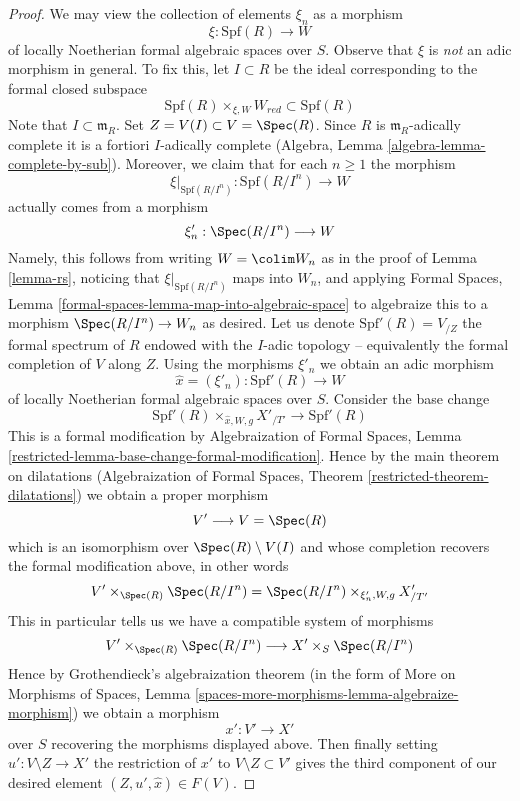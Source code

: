 \begin{proof}
\medskip\noindent
We may view the collection of elements $\xi_n$ as a morphism
$$
\xi : \text{Spf}(R) \longrightarrow W
$$
of locally Noetherian formal algebraic spaces over $S$. Observe that $\xi$
is {\it not} an adic morphism in general. To fix this, let $I \subset R$
be the ideal corresponding to the formal closed subspace
$$
\text{Spf}(R) \times_{\xi, W} W_{red} \subset \text{Spf}(R)
$$
Note that $I \subset \mathfrak m_R$. Set $Z = V(I) \subset V = \Spec(R)$.
Since $R$ is $\mathfrak m_R$-adically complete it is a fortiori
$I$-adically complete (Algebra, Lemma \ref{algebra-lemma-complete-by-sub}).
Moreover, we claim that for each $n \geq 1$ the morphism
$$
\xi|_{\text{Spf}(R/I^n)} :
\text{Spf}(R/I^n)
\longrightarrow
W
$$
actually comes from a morphism
$$
\xi'_n :  \Spec(R/I^n) \longrightarrow W
$$
Namely, this follows from writing $W = \colim W_n$ as in the
proof of Lemma \ref{lemma-rs}, noticing that $\xi|_{\text{Spf}(R/I^n)}$
maps into $W_n$, and applying Formal Spaces, Lemma
\ref{formal-spaces-lemma-map-into-algebraic-space}
to algebraize this to a morphism $\Spec(R/I^n) \to W_n$
as desired. Let us denote $\text{Spf}'(R) = V_{/Z}$ the formal spectrum
of $R$ endowed with the $I$-adic topology -- equivalently the formal
completion of $V$ along $Z$. Using the morphisms
$\xi'_n$ we obtain an adic morphism
$$
\hat x = (\xi'_n) : \text{Spf}'(R) \longrightarrow W
$$
of locally Noetherian formal algebraic spaces over $S$.
Consider the base change
$$
\text{Spf}'(R) \times_{\hat x, W, g} X'_{/T'} \longrightarrow \text{Spf}'(R)
$$
This is a formal modification by
Algebraization of Formal Spaces, Lemma
\ref{restricted-lemma-base-change-formal-modification}.
Hence by the main theorem on dilatations
(Algebraization of Formal Spaces, Theorem \ref{restricted-theorem-dilatations})
we obtain a proper morphism
$$
V' \longrightarrow V = \Spec(R)
$$
which is an isomorphism over $\Spec(R) \setminus V(I)$ and
whose completion recovers the formal modification above, in other words
$$
V' \times_{\Spec(R)} \Spec(R/I^n) =
\Spec(R/I^n) \times_{\xi'_n, W, g} X'_{/T'}
$$
This in particular tells us we have a compatible system of morphisms
$$
V' \times_{\Spec(R)} \Spec(R/I^n) \longrightarrow X' \times_S \Spec(R/I^n)
$$
Hence by Grothendieck's algebraization theorem (in the form of
More on Morphisms of Spaces, Lemma
\ref{spaces-more-morphisms-lemma-algebraize-morphism})
we obtain a morphism
$$
x' : V' \to X'
$$
over $S$ recovering the morphisms displayed above. Then finally
setting $u' : V \setminus Z \to X'$ the restriction of $x'$ to
$V \setminus Z \subset V'$ gives the third component of our
desired element $(Z, u', \hat x) \in F(V)$.
\end{proof}

